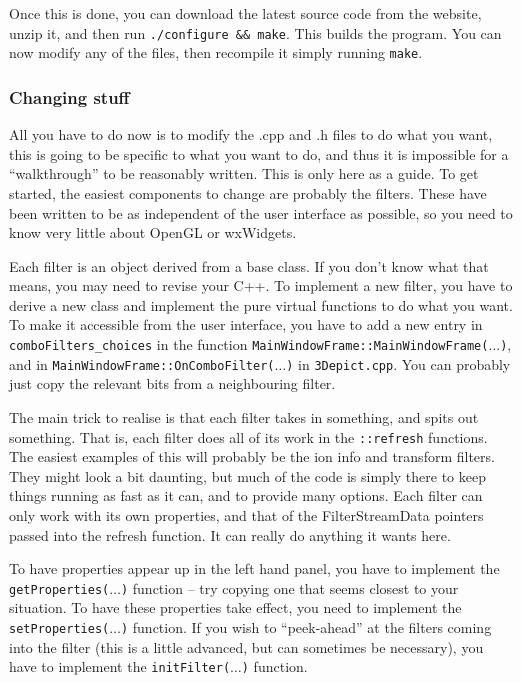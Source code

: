\documentclass[10pt]{article}
\begin{document}
Once this is done, you can download the latest source code from the website, unzip it, and then run \texttt{./configure \&\& make}. This builds the program. You can now modify any of the files, then recompile it simply running \texttt{make}.

\subsubsection{Changing stuff}
All you have to do now is to modify the .cpp and .h files to do what you want, this is going to be specific to what you want to do, and thus it is impossible for a ``walkthrough'' to be reasonably written. This is only here as a guide. To get started, the easiest components to change are probably the filters. These have been written to be as independent of the user interface as possible, so you need to know very little about OpenGL or wxWidgets. 

Each filter is an object derived from a base class. If you don't know what that means, you may need to revise your C++. To implement a new filter, you have to derive a new class and implement the pure virtual functions to do what you want. To make it accessible from the user interface, you have to add a new entry in  \texttt{comboFilters\_choices} in the function \texttt{MainWindowFrame::MainWindowFrame($\ldots$)}, and in \texttt{MainWindowFrame::OnComboFilter($\ldots$)} in \texttt{3Depict.cpp}. You can probably just copy the relevant bits from a neighbouring filter.

The main trick to realise is that each filter takes in something, and spits out something. That is, each filter does all of its work in the \texttt{::refresh} functions. The easiest examples of this will probably be the ion info and transform filters. They might look a bit daunting, but much of the code is simply there to keep things running as fast as it can, and to provide many options. Each filter can only work with its own properties, and that of the FilterStreamData pointers passed into the refresh function. It can really do anything it wants here.

To have properties appear up in the left hand panel, you have to implement the \texttt{getProperties($\ldots$)} function -- try copying one that seems closest to your situation. To have these properties take effect, you need to implement the \texttt{setProperties($\ldots$)} function. If you wish to ``peek-ahead'' at the filters coming into the filter (this is a little advanced, but can sometimes be necessary), you have to implement the \texttt{initFilter($\ldots$)} function.



\end{document}

